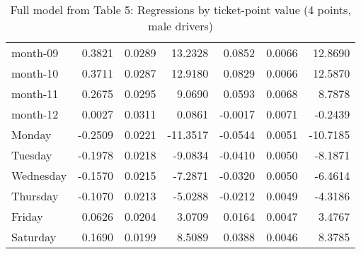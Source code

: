 \documentclass[10pt]{article}
\begin{document}
\begin{table}[ht]
\begin{tabular}{lrrrrrr}
  month-09 & 0.3821 & 0.0289 & 13.2328 & 0.0852 & 0.0066 & 12.8690 \\ 
  month-10 & 0.3711 & 0.0287 & 12.9180 & 0.0829 & 0.0066 & 12.5870 \\ 
  month-11 & 0.2675 & 0.0295 & 9.0690 & 0.0593 & 0.0068 & 8.7878 \\ 
  month-12 & 0.0027 & 0.0311 & 0.0861 & -0.0017 & 0.0071 & -0.2439 \\ 
  Monday & -0.2509 & 0.0221 & -11.3517 & -0.0544 & 0.0051 & -10.7185 \\ 
  Tuesday & -0.1978 & 0.0218 & -9.0834 & -0.0410 & 0.0050 & -8.1871 \\ 
  Wednesday & -0.1570 & 0.0215 & -7.2871 & -0.0320 & 0.0050 & -6.4614 \\ 
  Thursday & -0.1070 & 0.0213 & -5.0288 & -0.0212 & 0.0049 & -4.3186 \\ 
  Friday & 0.0626 & 0.0204 & 3.0709 & 0.0164 & 0.0047 & 3.4767 \\ 
  Saturday & 0.1690 & 0.0199 & 8.5089 & 0.0388 & 0.0046 & 8.3785 \\ 
   \hline
\end{tabular}
\caption{Full model from Table 5: Regressions by ticket-point value (4 points, male drivers)} 
\label{tab_5_4_pts_no_age_M}
\end{table}


\clearpage
\pagebreak



\end{document}
